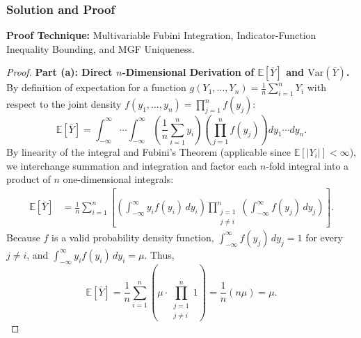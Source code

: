 \documentclass[11pt, letterpaper]{article}
\theoremstyle{definition}
\theoremstyle{remark}
\newcommand{\E}{\mathbb{E}}
\begin{document}
\subsubsection*{Solution and Proof}

\textbf{Proof Technique:} Multivariable Fubini Integration, Indicator-Function Inequality Bounding, and MGF Uniqueness.

\begin{proof}
\textbf{Part (a): Direct $n$-Dimensional Derivation of $\E[\bar{Y}]$ and $\text{Var}(\bar{Y})$.} \\ \relax
By definition of expectation for a function $g(Y_1, \dots, Y_n) = \frac{1}{n}\sum_{i=1}^n Y_i$ with respect to the joint density $f(y_1, \dots, y_n) = \prod_{j=1}^n f(y_j)$:
\[
    \E[\bar{Y}] = \int_{-\infty}^{\infty} \cdots \int_{-\infty}^{\infty} \left(\frac{1}{n} \sum_{i=1}^{n} y_i\right) \left(\prod_{j=1}^{n} f(y_j)\right) dy_1 \cdots dy_n.
\]
By linearity of the integral and Fubini's Theorem (applicable since $\E[|Y_i|] < \infty$), we interchange summation and integration and factor each $n$-fold integral into a product of $n$ one-dimensional integrals:
\begin{align*}
    \E[\bar{Y}] &= \frac{1}{n} \sum_{i=1}^{n} \left[ \left(\int_{-\infty}^{\infty} y_i f(y_i) \, dy_i\right) \prod_{\substack{j=1 \\ j \neq i}}^{n} \left(\int_{-\infty}^{\infty} f(y_j) \, dy_j\right) \right].
\end{align*}
Because $f$ is a valid probability density function, $\int_{-\infty}^{\infty} f(y_j)\,dy_j = 1$ for every $j \neq i$, and $\int_{-\infty}^{\infty} y_i f(y_i)\,dy_i = \mu$. Thus,
\[
    \E[\bar{Y}] = \frac{1}{n} \sum_{i=1}^{n} \left( \mu \cdot \prod_{\substack{j=1 \\ j \neq i}}^{n} 1 \right) = \frac{1}{n} (n\mu) = \mu.
\]


\end{proof}
\end{document}
